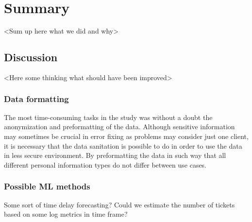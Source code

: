 
\section{Summary}\label{sec:summary}

<Sum up here what we did and why>

\subsection{Discussion}\label{subsec:discussion}
<Here some thinking what should have been improved>

\subsubsection*{Data formatting}
The most time-consuming tasks in the study
was without a doubt
the anonymization and preformatting of the data.
Although sensitive information may sometimes be crucial in error fixing
as problems may consider just one client,
it is necessary that the data sanitation is possible to do
in order to use the data in less secure environment.
By preformatting the data in such way
that all different personal information types
do not differ between use cases.


\subsubsection*{Possible ML methods}
Some sort of time delay forecasting?\cite{erharter2021pointlessness}
Could we estimate the number of tickets
based on some log metrics in time frame?



\clearpage